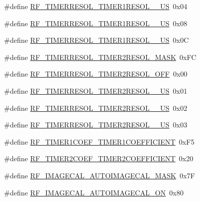 \begin{DoxyCompactItemize}
\item 
\#define \hyperlink{sx1276Regs-Fsk_8h_a96cf4090d4f2c3bad6d3700db6bd46d5}{R\+F\+\_\+\+T\+I\+M\+E\+R\+R\+E\+S\+O\+L\+\_\+\+T\+I\+M\+E\+R1\+R\+E\+S\+O\+L\+\_\+\_\+\+US}~0x04
\item 
\#define \hyperlink{sx1276Regs-Fsk_8h_a487b01361759b258d03235fcff6d5d51}{R\+F\+\_\+\+T\+I\+M\+E\+R\+R\+E\+S\+O\+L\+\_\+\+T\+I\+M\+E\+R1\+R\+E\+S\+O\+L\+\_\+\_\+\+US}~0x08
\item 
\#define \hyperlink{sx1276Regs-Fsk_8h_ac742a40587f098201b3fb024c6b24020}{R\+F\+\_\+\+T\+I\+M\+E\+R\+R\+E\+S\+O\+L\+\_\+\+T\+I\+M\+E\+R1\+R\+E\+S\+O\+L\+\_\+\_\+\+US}~0x0C
\item 
\#define \hyperlink{sx1276Regs-Fsk_8h_a23a05da24c57dc8c5b1f512637eb7d35}{R\+F\+\_\+\+T\+I\+M\+E\+R\+R\+E\+S\+O\+L\+\_\+\+T\+I\+M\+E\+R2\+R\+E\+S\+O\+L\+\_\+\+M\+A\+SK}~0x\+FC
\item 
\#define \hyperlink{sx1276Regs-Fsk_8h_a1f0fd645faed2c8357ebb3131369c9ba}{R\+F\+\_\+\+T\+I\+M\+E\+R\+R\+E\+S\+O\+L\+\_\+\+T\+I\+M\+E\+R2\+R\+E\+S\+O\+L\+\_\+\+O\+FF}~0x00
\item 
\#define \hyperlink{sx1276Regs-Fsk_8h_aaeb97a29ba9389511206598948f2b544}{R\+F\+\_\+\+T\+I\+M\+E\+R\+R\+E\+S\+O\+L\+\_\+\+T\+I\+M\+E\+R2\+R\+E\+S\+O\+L\+\_\+\_\+\+US}~0x01
\item 
\#define \hyperlink{sx1276Regs-Fsk_8h_a0c4dd1dabb1862f2898d6b2460c59c8d}{R\+F\+\_\+\+T\+I\+M\+E\+R\+R\+E\+S\+O\+L\+\_\+\+T\+I\+M\+E\+R2\+R\+E\+S\+O\+L\+\_\+\_\+\+US}~0x02
\item 
\#define \hyperlink{sx1276Regs-Fsk_8h_a565fce371ac9705658e6932916c3768a}{R\+F\+\_\+\+T\+I\+M\+E\+R\+R\+E\+S\+O\+L\+\_\+\+T\+I\+M\+E\+R2\+R\+E\+S\+O\+L\+\_\+\_\+\+US}~0x03
\item 
\#define \hyperlink{sx1276Regs-Fsk_8h_a8718af4d7f55436a3c9376964556c42f}{R\+F\+\_\+\+T\+I\+M\+E\+R1\+C\+O\+E\+F\+\_\+\+T\+I\+M\+E\+R1\+C\+O\+E\+F\+F\+I\+C\+I\+E\+NT}~0x\+F5
\item 
\#define \hyperlink{sx1276Regs-Fsk_8h_a815c5b653da11e17f1973a36f7e83fc6}{R\+F\+\_\+\+T\+I\+M\+E\+R2\+C\+O\+E\+F\+\_\+\+T\+I\+M\+E\+R2\+C\+O\+E\+F\+F\+I\+C\+I\+E\+NT}~0x20
\item 
\#define \hyperlink{sx1276Regs-Fsk_8h_a3a8677759e03ebc17657dae4e83ee3e6}{R\+F\+\_\+\+I\+M\+A\+G\+E\+C\+A\+L\+\_\+\+A\+U\+T\+O\+I\+M\+A\+G\+E\+C\+A\+L\+\_\+\+M\+A\+SK}~0x7F
\item 
\#define \hyperlink{sx1276Regs-Fsk_8h_a89ea44c76e321418f15421277a3ec28f}{R\+F\+\_\+\+I\+M\+A\+G\+E\+C\+A\+L\+\_\+\+A\+U\+T\+O\+I\+M\+A\+G\+E\+C\+A\+L\+\_\+\+ON}~0x80

\end{DoxyCompactItemize}

